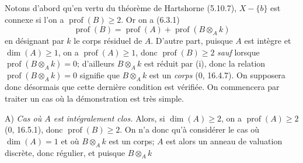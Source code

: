 Notons d'abord qu'en vertu du théorème de Hartshorne (5.10.7), $X-\{b\}$ est connexe si l'on a $\operatorname{prof}(B)\geq 2$. Or on a (6.3.1)
\begin{equation}
  \operatorname{prof}(B)=\operatorname{prof}(A)+\operatorname{prof}(B\otimes_A k)
  \tag{18.9.7.4}
  \label{IV.18.9.7.4}
\end{equation}
en désignant par $k$ le corps résiduel de $A$. D'autre part, puisque $A$ est intègre et $\dim(A)\geq 1$, on a $\operatorname{prof}(A)\geq 1$, donc $\operatorname{prof}(B)\geq 2$ \emph{sauf} lorsque $\operatorname{prof}(B\otimes_A k)=0$; d'ailleurs $B\otimes_A k$ est réduit par (i), donc la relation $\operatorname{prof}(B\otimes_A k)=0$ signifie que $B\otimes_A k$ est un \emph{corps} (0, 16.4.7). On supposera donc désormais que cette dernière condition est vérifiée. On commencera par traiter un cas où la démonstration est très simple.

A) \emph{Cas où $A$ est intégralement clos.} Alors, si $\dim(A)\geq 2$, on a $\operatorname{prof}(A)\geq 2$ (0, 16.5.1), donc $\operatorname{prof}(B)\geq 2$. On n'a donc qu'à considérer le cas où $\dim(A)=1$ et où $B\otimes_A k$ est un corps; $A$ est alors un anneau de valuation discrète, donc régulier, et puisque $B\otimes_A k$

